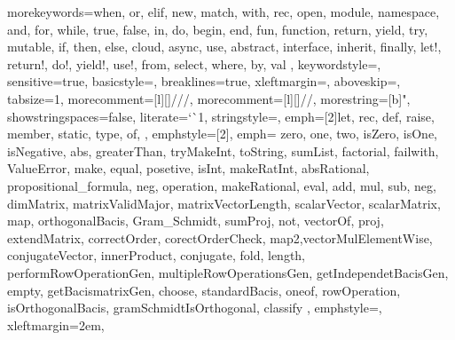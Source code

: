 \usepackage{tikz}

\usepackage{listings}
\usepackage{xcolor}
\usepackage{centernot}







%
{
  morekeywords={when, or, elif, new, match, with, rec, open, module, namespace, %
    and, for, while, true, false, in, do, begin, end, fun, function, return, yield, try, %
    mutable, if, then, else, cloud, async, use, abstract, interface, inherit, finally,
    let!, return!, do!, yield!, use!, from, select, where, by, val },
  keywordstyle=\color{codepurple},
  sensitive=true,
  basicstyle=\ttfamily\small,
  breaklines=true,
  xleftmargin=\parindent,
  aboveskip=\bigskipamount,
  tabsize=1,
  morecomment=[l][\color{greencomments}]{///},
  morecomment=[l][\color{greencomments}]{//},
  morestring=[b]",
  showstringspaces=false,
  literate={`}{\`}1,
  stringstyle=\color{greencomments},
  emph={[2]let, rec, def, raise, member, static, type, of, }, %
  emphstyle={[2]\color{bluekeywords}},
  emph={
    zero, one, two, isZero, isOne, isNegative, abs, greaterThan, tryMakeInt, toString, sumList, factorial, failwith, ValueError, make, equal, posetive, isInt, makeRatInt, absRational, propositional_formula, neg, operation, makeRational, eval, add, mul, sub, neg, dimMatrix, matrixValidMajor, matrixVectorLength, scalarVector, scalarMatrix, map, orthogonalBacis, Gram_Schmidt, sumProj, not, vectorOf, proj, extendMatrix, correctOrder, corectOrderCheck, map2,vectorMulElementWise, conjugateVector, innerProduct, conjugate, fold, length, performRowOperationGen, multipleRowOperationsGen, getIndependetBacisGen, empty, getBacismatrixGen, choose, standardBacis, oneof, rowOperation, isOrthogonalBacis, gramSchmidtIsOrthogonal, classify
    }, %
  emphstyle=\color{red},
  xleftmargin=2em,
}




